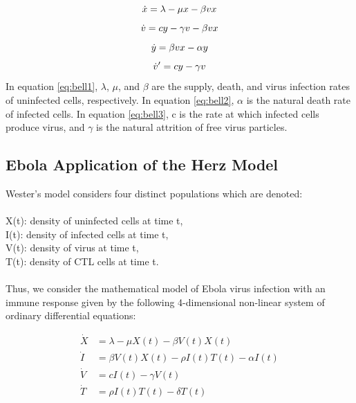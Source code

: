 \documentclass{article}
\begin{document}
\begin{equation}
		\label{eq:bell1}
		\dot x = \lambda - \mu x - \beta vx\\
\end{equation}
\begin{equation}
\label{eq:bell4}
\dot v = cy - \gamma v - \beta vx\\
\end{equation}
\begin{equation}
		\label{eq:bell2}
		\dot y = \beta vx - \alpha y\\
\end{equation}
\begin{equation}
\label{eq:bell3}
\dot v' = cy - \gamma v\\
\end{equation}
In equation \ref{eq:bell1}, $\lambda$, $\mu$, and $\beta$ are the supply, death, and virus infection rates of uninfected cells, respectively.
In equation \ref{eq:bell2}, $\alpha$ is the natural death rate of infected cells.
In equation \ref{eq:bell3}, c is the rate at which infected cells produce virus, and $\gamma$ is the natural attrition of free virus particles.\\

\subsection{Ebola Application of the Herz Model}
Wester's model considers four distinct populations which are denoted:\\
\\
X(t): density of uninfected cells at time t,\\
I(t): density of infected cells at time t,\\
V(t): density of virus at time t,\\
T(t): density of CTL cells at time t.\\
\\
Thus, we consider the mathematical model of Ebola virus infection with an immune response given by the following 4-dimensional non-linear system of ordinary differential equations:

\begin{equation}
\begin{split}
	\dot X &= \lambda - \mu X(t) - \beta V(t)X(t) \\
	\dot I &= \beta V(t)X(t) - \rho I(t)T(t) - \alpha I(t) \\
	\dot V &= cI(t) - \gamma V(t) \\
	\dot T &= \rho I(t)T(t) - \delta T(t) \\
\end{split}
\end{equation}
\end{document}
